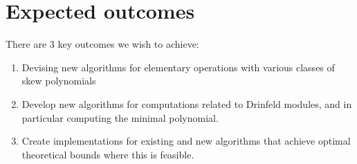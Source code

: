 
\chapter{Expected outcomes} \label{ch-1}
There are 3 key outcomes we wish to achieve:

\begin{enumerate}
    \item Devising new algorithms for elementary operations with various classes of skew polynomials
    \item Develop new algorithms for computations related to Drinfeld modules, and in particular computing the minimal polynomial.
    \item Create implementations for existing and new algorithms that achieve optimal theoretical bounds where this is feasible.
\end{enumerate}


